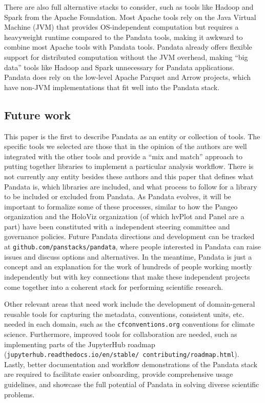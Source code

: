 There are also full alternative stacks to consider, such as tools like Hadoop \citep{white:hadoop15} and Spark \citep{zaharia:cacm16} from the Apache Foundation. Most Apache tools rely on the Java Virtual Machine (JVM) that provides OS-independent computation but requires a heavyweight runtime compared to the Pandata tools, making it awkward to combine most Apache tools with Pandata tools. Pandata already offers flexible support for distributed computation without the JVM overhead, making ``big data'' tools like Hadoop and Spark unnecessary for Pandata applications. Pandata does rely on the low-level Apache Parquet and Arrow projects, which have non-JVM implementations that fit well into the Pandata stack.

\subsection{Future work}
This paper is the first to describe Pandata as an entity or collection of tools. The specific tools we selected are those that in the opinion of the authors are well integrated with the other tools and provide a ``mix and match'' approach to putting together libraries to implement a particular analysis workflow. There is not currently any entity besides these authors and this paper that defines what Pandata is, which libraries are included, and what process to follow for a library to be included or excluded from Pandata. As Pandata evolves, it will be important to formalize some of these processes, similar to how the Pangeo organization and the HoloViz organization (of which hvPlot and Panel are a part) have been constituted with a independent steering committee and governance policies. Future Pandata directions and development can be tracked at \texttt{github.com/panstacks/pandata}, where people interested in Pandata can raise issues and discuss options and alternatives. In the meantime, Pandata is just a concept and an explanation for the work of hundreds of people working mostly independently but with key connections that make these independent projects come together into a coherent stack for performing scientific research.

Other relevant areas that need work include the development of domain-general reusable tools for capturing the metadata, conventions, consistent units, etc. needed in each domain, such as the \texttt{cfconventions.org} conventions for climate science. Furthermore, improved tools for collaboration are needed, such as implementing parts of the JupyterHub roadmap (\texttt{jupyterhub.readthedocs.io/en/stable/ contributing/roadmap.html}). Lastly, better documentation and workflow demonstrations of the Pandata stack are required to facilitate easier onboarding, provide comprehensive usage guidelines, and showcase the full potential of Pandata in solving diverse scientific problems.



